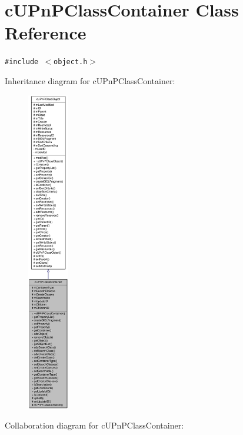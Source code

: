 \hypertarget{classcUPnPClassContainer}{
\section{cUPnPClassContainer Class Reference}
\label{classcUPnPClassContainer}
}
{\tt \#include $<$object.h$>$}

Inheritance diagram for cUPnPClassContainer:\nopagebreak
\begin{figure}[H]
\begin{center}
\leavevmode
\includegraphics[height=400pt]{classcUPnPClassContainer__inherit__graph}
\end{center}
\end{figure}
Collaboration diagram for cUPnPClassContainer:\nopagebreak
